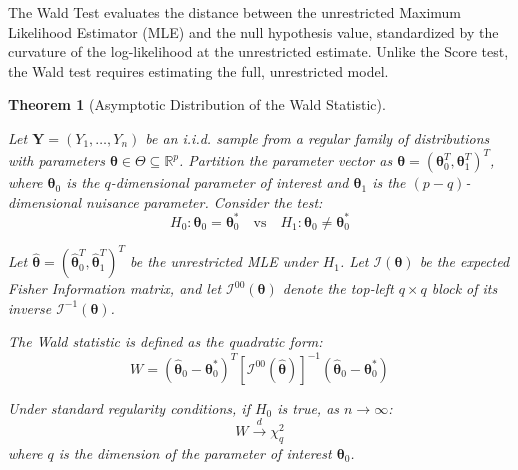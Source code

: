 \documentclass[
  letterpaper,
  DIV=11,
  numbers=noendperiod]{scrreprt}
\renewcommand{\[}{\begin{equation}}
\renewcommand{\]}{\end{equation}}
\theoremstyle{definition}
\theoremstyle{plain}
\theoremstyle{plain}
\theoremstyle{plain}
\newtheorem{theorem}{Theorem}[chapter]
\theoremstyle{definition}
\theoremstyle{plain}
\theoremstyle{remark}
\begin{document}
The Wald Test evaluates the distance between the unrestricted Maximum
Likelihood Estimator (MLE) and the null hypothesis value, standardized
by the curvature of the log-likelihood at the unrestricted estimate.
Unlike the Score test, the Wald test requires estimating the full,
unrestricted model.

\begin{theorem}[Asymptotic Distribution of the Wald
Statistic]\protect\hypertarget{thm-wald}{}\label{thm-wald}

Let \(\mathbf{Y} = (Y_1, \dots, Y_n)\) be an i.i.d. sample from a
regular family of distributions with parameters
\(\boldsymbol{\theta} \in \Theta \subseteq \mathbb{R}^{p}\). Partition
the parameter vector as
\(\boldsymbol{\theta} = (\boldsymbol{\theta}_0^T, \boldsymbol{\theta}_1^T)^T\),
where \(\boldsymbol{\theta}_0\) is the \(q\)-dimensional parameter of
interest and \(\boldsymbol{\theta}_1\) is the \((p-q)\)-dimensional
nuisance parameter. Consider the test:
\[H_0: \boldsymbol{\theta}_0 = \boldsymbol{\theta}_0^* \quad \text{vs} \quad H_1: \boldsymbol{\theta}_0 \neq \boldsymbol{\theta}_0^*\]

Let
\(\hat{\boldsymbol{\theta}} = (\hat{\boldsymbol{\theta}}_0^T, \hat{\boldsymbol{\theta}}_1^T)^T\)
be the unrestricted MLE under \(H_1\). Let
\(\mathcal{I}(\boldsymbol{\theta})\) be the expected Fisher Information
matrix, and let \(\mathcal{I}^{00}(\boldsymbol{\theta})\) denote the
top-left \(q \times q\) block of its inverse
\(\mathcal{I}^{-1}(\boldsymbol{\theta})\).

The Wald statistic is defined as the quadratic form:
\[W = (\hat{\boldsymbol{\theta}}_0 - \boldsymbol{\theta}_0^*)^T [\mathcal{I}^{00}(\hat{\boldsymbol{\theta}})]^{-1} (\hat{\boldsymbol{\theta}}_0 - \boldsymbol{\theta}_0^*)\]

Under standard regularity conditions, if \(H_0\) is true, as
\(n \to \infty\): \[W \xrightarrow{d} \chi^2_q\] where \(q\) is the
dimension of the parameter of interest \(\boldsymbol{\theta}_0\).

\end{theorem}
\end{document}
